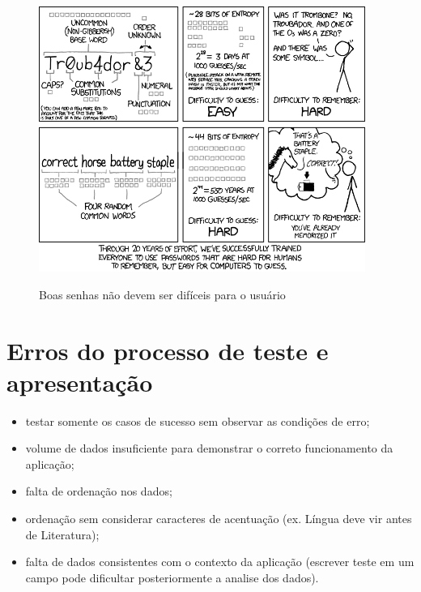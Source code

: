 \begin{figure}
    \centering
    \caption{Boas senhas não devem ser difíceis para o usuário}
	\includegraphics[width=0.95\textwidth]{erros/password_strength.png}
    \label{fig:password_strength}
\end{figure}




\section{Erros do processo de teste e apresentação}

\begin{itemize}

    \item testar somente os casos de sucesso sem observar as condições de erro;
    
    \item volume de dados insuficiente para demonstrar o correto funcionamento da aplicação;
    
    \item falta de ordenação nos dados;
    
    \item ordenação sem considerar caracteres de acentuação (ex. Língua deve vir antes de Literatura);
    
    \item falta de dados consistentes com o contexto da aplicação (escrever teste em um campo pode dificultar posteriormente a analise dos dados).
    
\end{itemize}

